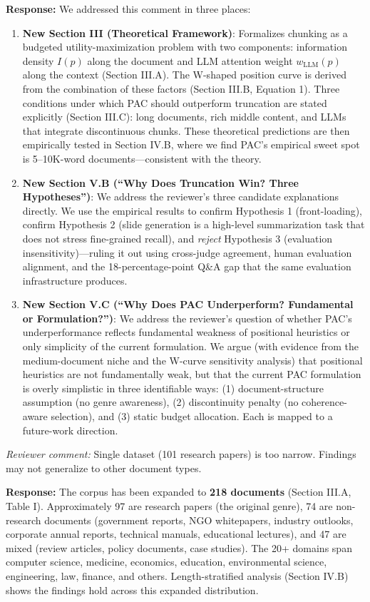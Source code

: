 \documentclass[11pt]{article}
\newcommand{\rcomment}[1]{\noindent\textcolor{revcomment}{\textit{Reviewer comment:}} #1\medskip}
\newcommand{\rresponse}[1]{\noindent\textcolor{response}{\textbf{Response:}} #1\medskip\medskip}
\begin{document}
\rresponse{We addressed this comment in three places:
\begin{enumerate}
    \item \textbf{New Section III (Theoretical Framework)}: Formalizes chunking as a budgeted utility-maximization problem with two components: information density $I(p)$ along the document and LLM attention weight $w_{\text{LLM}}(p)$ along the context (Section III.A). The W-shaped position curve is derived from the combination of these factors (Section III.B, Equation 1). Three conditions under which PAC should outperform truncation are stated explicitly (Section III.C): long documents, rich middle content, and LLMs that integrate discontinuous chunks. These theoretical predictions are then empirically tested in Section IV.B, where we find PAC's empirical sweet spot is 5--10K-word documents---consistent with the theory.
    \item \textbf{New Section V.B (``Why Does Truncation Win? Three Hypotheses'')}: We address the reviewer's three candidate explanations directly. We use the empirical results to confirm Hypothesis 1 (front-loading), confirm Hypothesis 2 (slide generation is a high-level summarization task that does not stress fine-grained recall), and \textit{reject} Hypothesis 3 (evaluation insensitivity)---ruling it out using cross-judge agreement, human evaluation alignment, and the 18-percentage-point Q\&A gap that the same evaluation infrastructure produces.
    \item \textbf{New Section V.C (``Why Does PAC Underperform? Fundamental or Formulation?'')}: We address the reviewer's question of whether PAC's underperformance reflects fundamental weakness of positional heuristics or only simplicity of the current formulation. We argue (with evidence from the medium-document niche and the W-curve sensitivity analysis) that positional heuristics are not fundamentally weak, but that the current PAC formulation is overly simplistic in three identifiable ways: (1) document-structure assumption (no genre awareness), (2) discontinuity penalty (no coherence-aware selection), and (3) static budget allocation. Each is mapped to a future-work direction.
\end{enumerate}}

\rcomment{Single dataset (101 research papers) is too narrow. Findings may not generalize to other document types.}

\rresponse{The corpus has been expanded to \textbf{218 documents} (Section III.A, Table I). Approximately 97 are research papers (the original genre), 74 are non-research documents (government reports, NGO whitepapers, industry outlooks, corporate annual reports, technical manuals, educational lectures), and 47 are mixed (review articles, policy documents, case studies). The 20+ domains span computer science, medicine, economics, education, environmental science, engineering, law, finance, and others. Length-stratified analysis (Section IV.B) shows the findings hold across this expanded distribution.}
\end{document}
